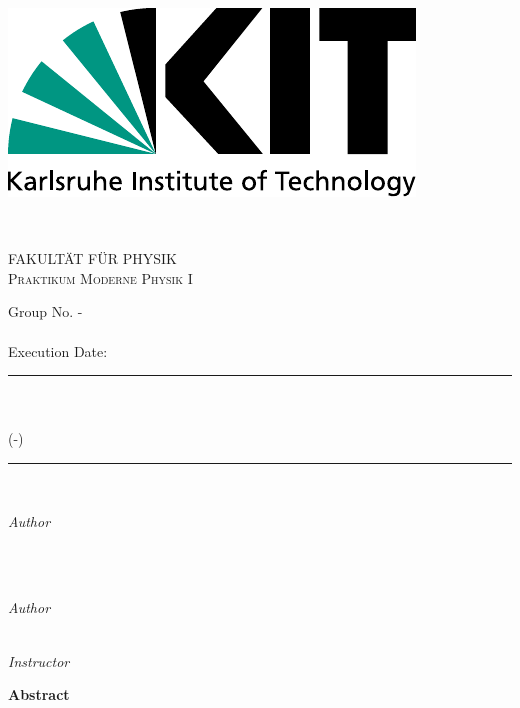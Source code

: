 \begin{titlepage}

	\newcommand{\Hrule}{\rule{\linewidth}{0.5mm}}
	\begin{minipage}{0.5\textwidth}
		\begin{flushleft}
			\includegraphics[width=.5\textwidth]{../praktikum-protokollvorlage-latex/include/logo.pdf}
		\end{flushleft}
	\end{minipage}
	~
	\begin{minipage}{0.5\textwidth}
		\begin{flushright}
			\textsc{FAKULTÄT FÜR PHYSIK\\Praktikum Moderne Physik I}
		\end{flushright}
	\end{minipage}\par

	\center
	{\LARGE Group No. \wochentag-\gruppennr}\\[1.5cm]
	{\Large \emailadressen}\\[0.5cm]
	{\large Execution Date: \durchgefuehrt}\\[0.5cm]

	\Hrule\\[0.4cm]
	{\huge\bfseries \versuch}\\[0.2cm]
	(\praktikum-\versuchsnr)\\[0.4cm]
	\Hrule\\[1.5cm]

	\begin{minipage}{0.4\textwidth}
		\begin{flushleft}
			\large
			\textit{Author}\\
			\vornamea\ \textsc{\nachnamea}
		\end{flushleft}
	\end{minipage}
	~
	\begin{minipage}{0.4\textwidth}
		\begin{flushright}
			\large
			\textit{Author}\\
			\vornameb\ \textsc{\nachnameb}
		\end{flushright}
	\end{minipage}\par
	\textit{Instructor}\\
	\betreuer

	\vfill\vfill
	{\LARGE \textbf{Abstract}}\\[0.4cm]

	\abstract

\end{titlepage}
